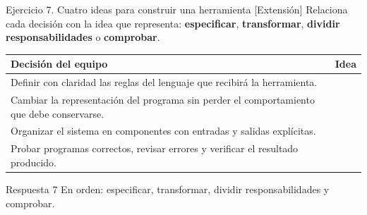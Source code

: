 \documentclass[11pt,spanish]{article}
\begin{document}
\begin{ejercicio}{Ejercicio 7. Cuatro ideas para construir una herramienta \hfill {\small [Extensión]}}
Relaciona cada decisión con la idea que representa: \textbf{especificar}, \textbf{transformar}, \textbf{dividir responsabilidades} o \textbf{comprobar}.

\begin{center}
\small
\begin{tabular}{|p{}|p{}|}
\hline
\textbf{Decisión del equipo} & \textbf{Idea} \tabularnewline
\hline
Definir con claridad las reglas del lenguaje que recibirá la herramienta. & \tabularnewline[0.7cm]
\hline
Cambiar la representación del programa sin perder el comportamiento que debe conservarse. & \tabularnewline[0.7cm]
\hline
Organizar el sistema en componentes con entradas y salidas explícitas. & \tabularnewline[0.7cm]
\hline
Probar programas correctos, revisar errores y verificar el resultado producido. & \tabularnewline[0.7cm]
\hline
\end{tabular}
\end{center}
\end{ejercicio}

\ifrespuestas
\begin{respuesta}{Respuesta 7}
En orden: especificar, transformar, dividir responsabilidades y comprobar.
\end{respuesta}
\fi
\end{document}
